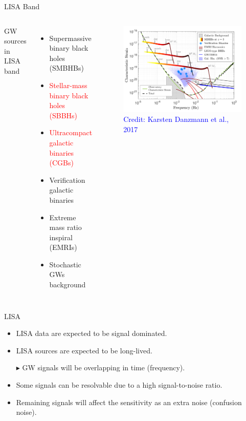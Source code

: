 \documentclass[pdf]{beamer}
\newcommand{\credit}[1]{\tiny{\textcolor{blue}{Credit: #1}}}
\begin{document}
\begin{frame}{LISA Band}
\begin{columns}
\hspace{.5cm}
GW sources in LISA band
\begin{itemize}
\item Supermassive binary black holes (SMBHBs)
\item \textcolor{red}{Stellar-mass binary black holes (SBBHs)}
\item \textcolor{red}{Ultracompact galactic binaries (CGBs)}
\item Verification galactic binaries
\item Extreme mass ratio inspiral (EMRIs)
\item Stochastic GWs background 
\end{itemize}
\begin{figure}
\includegraphics[width = \textwidth]{fig/observedLISA.png}
\caption*{\credit{Karsten Danzmann et al., 2017}}
\end{figure}
\end{columns}
\end{frame}

\begin{frame}{LISA}
\begin{itemize}
\item LISA data are expected to be signal dominated.
\item LISA sources are expected to be long-lived.
\item[$\blacktriangleright$] GW signals will be overlapping in time (frequency).
\pause
\item Some signals can be resolvable due to a high signal-to-noise ratio.
\pause
\item Remaining signals will affect the sensitivity as an extra noise (confusion noise).
\end{itemize}
\end{frame}
\end{document}
